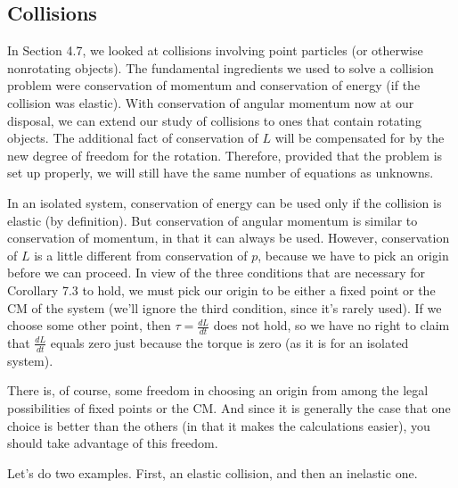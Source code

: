 \documentclass[11pt]{article}
\begin{document}
\subsection{Collisions}
In Section 4.7, we looked at collisions involving point particles (or otherwise
nonrotating objects). The fundamental ingredients we used to solve a collision
problem were conservation of momentum and conservation of energy (if the
collision was elastic). With conservation of angular momentum now at our
disposal, we can extend our study of collisions to ones that contain rotating
objects. The additional fact of conservation of \(L\) will be compensated for
by the new degree of freedom for the rotation. Therefore, provided that the
problem is set up properly, we will still have the same number of equations as
unknowns.

In an isolated system, conservation of energy can be used only if the collision
is elastic (by definition). But conservation of angular momentum is similar to
conservation of momentum, in that it can always be used. However, conservation
of \(L\) is a little different from conservation of \(p\), because we have to
pick an origin before we can proceed. In view of the three conditions that are
necessary for Corollary 7.3 to hold, we must pick our origin to be either a
fixed point or the CM of the system (we’ll ignore the third condition, since
it’s rarely used). If we choose some other point, then \(\tau = \frac{dL}{dt}\)
does not hold, so we have no right to claim that \(\frac{dL}{dt}\) equals zero
just because the torque is zero (as it is for an isolated system).

There is, of course, some freedom in choosing an origin from among the legal
possibilities of fixed points or the CM. And since it is generally the case
that one choice is better than the others (in that it makes the calculations
easier), you should take advantage of this freedom.

Let’s do two examples. First, an elastic collision, and then an inelastic one.
\end{document}
